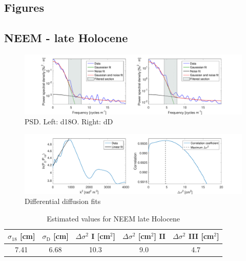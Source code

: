 \documentclass[11pt, draftcls, onecolumn]{IEEEtran} %
\numberwithin{equation}{section}
\numberwithin{table}{section}
\numberwithin{figure}{section}
\begin{document}
\begin{appendices}
\clearpage
\section{Figures} \label{sec:appendix_spectra_figures}
\subsection{NEEM - late Holocene}

\begin{figure}[H]
	\vspace*{2mm}
	\begin{center}
		\includegraphics[width=1\textwidth]{Figure_16}
		\caption{PSD. Left: d18O. Right: dD}  \label{fig:NEEM_late_fig_1}
	\end{center}
\end{figure}

\begin{figure}[H]
	\vspace*{2mm}
	\begin{center}
		\includegraphics[width=1\textwidth]{Figure_17}
		\caption{Differential diffusion fits}  \label{fig:NEEM_late_fig_2}
	\end{center}
\end{figure}

\begin{table}[H]
	\center
	\caption{Estimated values for NEEM late Holocene}
	\label{NEEM_holo_tbl}
	\begin{tabular}{c c c c c} 
		\toprule
		$\sigma_{18}$ [cm] & $\sigma_\mathrm{D}$ [cm] & $\Delta\sigma^2$ I [cm$^2$] & $\Delta\sigma^2$ [cm$^2$] II & $\Delta\sigma^2$ III [cm$^2$] \\
		\midrule
		7.41 &   6.68 &    10.3 &     9.0 &     4.7 \\
		\bottomrule		
	\end{tabular}
\end{table}
\clearpage

\end{appendices}
\end{document}
